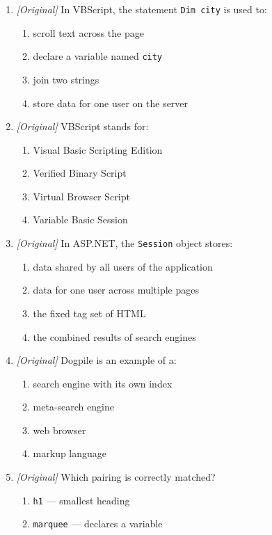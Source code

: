\documentclass[11pt]{article}
\begin{document}
\begin{enumerate}[label=\textbf{Q\arabic*.}, leftmargin=*]
\begin{enumerate}[label=\Alph*.]
  \end{enumerate}
\item \textit{[Original]} In VBScript, the statement \texttt{Dim city} is used to:
  \begin{enumerate}[label=\Alph*.]
    \item scroll text across the page
    \item declare a variable named \texttt{city}
    \item join two strings
    \item store data for one user on the server
  \end{enumerate}
\item \textit{[Original]} VBScript stands for:
  \begin{enumerate}[label=\Alph*.]
    \item Visual Basic Scripting Edition
    \item Verified Binary Script
    \item Virtual Browser Script
    \item Variable Basic Session
  \end{enumerate}
\item \textit{[Original]} In ASP.NET, the \texttt{Session} object stores:
  \begin{enumerate}[label=\Alph*.]
    \item data shared by all users of the application
    \item data for one user across multiple pages
    \item the fixed tag set of HTML
    \item the combined results of search engines
  \end{enumerate}
\item \textit{[Original]} Dogpile is an example of a:
  \begin{enumerate}[label=\Alph*.]
    \item search engine with its own index
    \item meta-search engine
    \item web browser
    \item markup language
  \end{enumerate}
\item \textit{[Original]} Which pairing is correctly matched?
  \begin{enumerate}[label=\Alph*.]
    \item \texttt{h1} --- smallest heading
    \item \texttt{marquee} --- declares a variable

\end{enumerate}
\end{enumerate}
\end{document}
